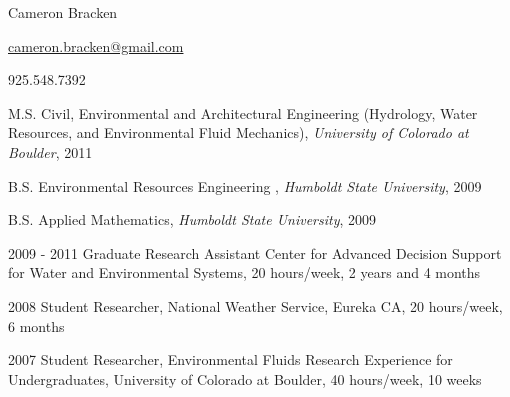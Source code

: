 \documentclass[10pt,a4paper]{scrartcl}
\begin{document}
    \begin{cv}{}
        \begin{cvlist}{}\label{info}  
            \item   Cameron Bracken
            \item   \url{cameron.bracken@gmail.com}
            \item   925.548.7392
        \end{cvlist}
        
        \begin{cvlist}{}\label{edu}
            \item[M.S.]   { Civil, Environmental and Architectural Engineering (Hydrology, Water Resources, and Environmental Fluid Mechanics)}, {\it University of Colorado at Boulder}, 2011
            \item[B.S.]   { Environmental Resources Engineering }, {\it Humboldt State University}, 2009
            \item[B.S.]   {Applied Mathematics}, {\it Humboldt State University}, 2009
        \end{cvlist}
        
        \begin{cvlist}{}\label{exp}
            {\setlength{\itemsep}{1pt}
            \setlength{\parskip}{0pt}
            \setlength{\parsep}{0pt}
            
            \item[2009 - 2011] Graduate Research Assistant Center for Advanced Decision Support for Water and Environmental Systems, 20 hours/week, 2 years and 4 months}
            \item[2008] Student Researcher, National Weather Service, Eureka CA, 20 hours/week, 6 months
            \item[2007] Student Researcher, Environmental Fluids Research Experience for Undergraduates, University of Colorado at Boulder, 40 hours/week, 10 weeks
        \end{cvlist}
        

\end{cv}
\end{document}
